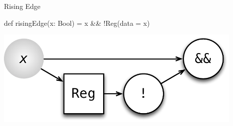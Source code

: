 \documentclass[xcolor=pdflatex,dvipsnames,table]{beamer}
\begin{document}
\begin{frame}[fragile]{Rising Edge}

\begin{scala}
def risingEdge(x: Bool) = x && !Reg(data = x)
\end{scala}

\begin{center}
\includegraphics[width=0.9\textwidth]{figs/rising-edge.pdf} 
\end{center}

\end{frame}
\end{document}
